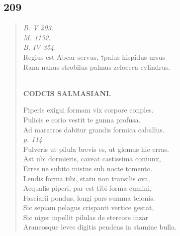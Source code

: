 \documentclass[11pt, a4paper]{report}
\begin{document}
            \subsection*{209}
      \begin{verse}
      \textit{B. V 203.} \\ \textit{M. 1132.} \\ \textit{B. IV 354.} \\ Regius est Abcar servus, †palus hispidus ursus \\ Rana nanus strobilus palmus zeloceca cylindrus. \\ 
        ﻿\pagebreak 
    \begin{center} \textbf{CODCIS SALMASIANI.} \end{center} \marginpar{[179]} Piperis exigui formam vix corpore conples. \\ Pulicis e corio vestit te gunna profusa. \\ Ad maratros dabitur grandis formica caballus. \\ \textit{p. 114} \\ Pulveris ut pilula brevis es, ut glomus hic erras. \\ Ast ubi dormieris, caveat castissima coniunx, \\ Erres ne subito mistus sub nocte tomento. \\ Lendis forma tibi, statu non transilis ova, \\ Aequalis pipcri, par est tibi forma cumini, \\ Fasciarii pondus, longi pars summa telonis. \\ Sic sepiam pelagus crispanti vertice gestat, \\ Sic niger inpellit pilulas de stercore inzar \\ Araneosque leves digitis pendens in stamine bulla. \\ 
      \end{verse}
  
\end{document}
